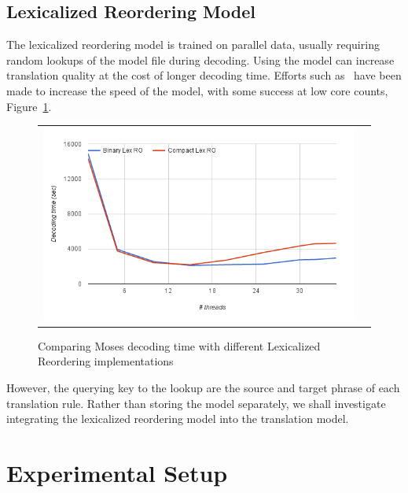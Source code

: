 \documentclass[11pt]{article}
\begin{document}
\subsection{Lexicalized Reordering Model}

The lexicalized reordering model is trained on parallel data, usually requiring random lookups of the model file during decoding. Using the model can increase translation quality at the cost of longer decoding time. Efforts such as~ have been made to increase the speed of the model, with some success at low core counts, Figure~\ref{fig:moses-lex-ro}.
\begin{figure}[h]
\centering
\begin{tabular}{cc}
{\includegraphics[scale=0.4]{moses-lex-ro.png}} 
\end{tabular}
\caption{Comparing Moses decoding time with different Lexicalized Reordering implementations}
\label{fig:moses-lex-ro}
\end{figure} 

However, the querying key to the lookup are the source and target phrase of each translation rule. Rather than storing the model separately, we shall investigate integrating the lexicalized reordering model into the translation model.


\section{Experimental Setup}
\end{document}
